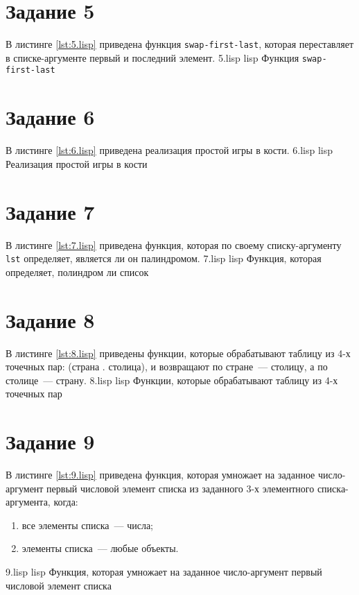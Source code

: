 \section{Задание 5}

В листинге \ref{lst:5.lisp} приведена функция \texttt{swap-first-last}, которая переставляет в списке-аргументе первый и последний элемент.
	{5.lisp}
	{lisp}
	{Функция \texttt{swap-first-last}}

\section{Задание 6}

В листинге \ref{lst:6.lisp} приведена реализация простой игры в кости.
	{6.lisp}
	{lisp}
	{Реализация простой игры в кости}

\section{Задание 7}

В листинге \ref{lst:7.lisp} приведена функция, которая по своему списку-аргументу \texttt{lst} определяет, является ли он палиндромом.
	{7.lisp}
	{lisp}
	{Функция, которая определяет, полиндром ли список}

\clearpage

\section{Задание 8}

В листинге \ref{lst:8.lisp} приведены функции, которые обрабатывают таблицу из 4-х точечных пар: (страна . столица), и возвращают по стране~--- столицу, а по столице~--- страну.
	{8.lisp}
	{lisp}
	{Функции, которые обрабатывают таблицу из 4-х точечных пар}

\section{Задание 9}

В листинге \ref{lst:9.lisp} приведена функция, которая умножает на заданное число-аргумент первый числовой элемент списка из заданного 3-х элементного списка-аргумента, когда:
\begin{enumerate}
	\item все элементы списка~--- числа;
	\item элементы списка~--- любые объекты.
\end{enumerate}
	{9.lisp}
	{lisp}
	{Функция, которая умножает на заданное число-аргумент первый числовой элемент списка}
